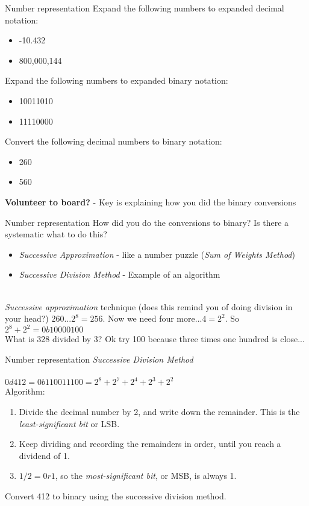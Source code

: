 \documentclass{beamer}
\begin{document}
\begin{frame}{Number representation}
Expand the following numbers to expanded decimal notation:
\begin{itemize}
\item -10.432
\item 800,000,144
\end{itemize}
Expand the following numbers to expanded binary notation:
\begin{itemize}
\item 10011010
\item 11110000
\end{itemize}
Convert the following decimal numbers to binary notation:
\begin{itemize}
\item 260
\item 560
\end{itemize}
\textbf{Volunteer to board?} - Key is explaining how you did the binary conversions
\end{frame}

\begin{frame}{Number representation}
How did you do the conversions to binary?  Is there a systematic what to do this? \\
\begin{itemize}
\item \textit{Successive Approximation} - like a number puzzle (\textit{Sum of Weights Method})
\item \textit{Successive Division Method} - Example of an algorithm
\end{itemize}
\hrulefill \\ \vspace{0.5cm}
\textit{Successive approximation} technique (does this remind you of doing division in your head?)
$260$...$2^8 = 256$.  Now we need four more...$4 = 2^2$.  So $2^8 + 2^2 = 0b10000100$ \\ \vspace{0.5cm}
What is 328 divided by 3?  Ok try 100 because three times one hundred is close...
\end{frame}

\begin{frame}{Number representation}
\textit{Successive Division Method} \\ \vspace{0.5cm} \hrulefill \\
$0d412 = 0b110011100 = 2^8 + 2^7 + 2^4 + 2^3 + 2^2$ \\
Algorithm:
\begin{enumerate}
\item Divide the decimal number by 2, and write down the remainder.  This is the \textit{least-significant bit} or LSB.
\item Keep dividing and recording the remainders in order, until you reach a dividend of 1.
\item $1/2 = 0 r 1$, so the \textit{most-significant bit}, or MSB, is always 1.
\end{enumerate}
Convert 412 to binary using the successive division method.
\end{frame}
\end{document}
